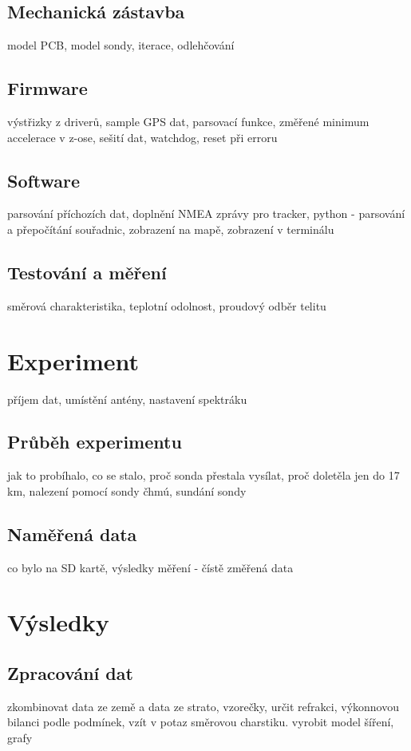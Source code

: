 \documentclass[twoside]{ctuthesis}
\theoremstyle{plain}
\theoremstyle{definition}
\theoremstyle{note}
\begin{document}
	\section{Mechanická zástavba}
	model PCB, model sondy, iterace, odlehčování

	\section{Firmware}
	výstřizky z driverů, sample GPS dat, parsovací funkce, změřené minimum accelerace v z-ose, sešití dat, watchdog, reset při erroru

	\section{Software}
	parsování příchozích dat, doplnění NMEA zprávy pro tracker, python - parsování a přepočítání souřadnic, zobrazení na mapě, zobrazení v terminálu

	\section{Testování a měření}
	směrová charakteristika, teplotní odolnost, proudový odběr telitu 




\chapter{Experiment}
příjem dat, umístění antény, nastavení spektráku
	\section{Průběh experimentu}
	jak to probíhalo, co se stalo, proč sonda přestala vysílat, proč doletěla jen do 17 km, nalezení pomocí sondy čhmú, sundání sondy

	\section{Naměřená data}
	co bylo na SD kartě, výsledky měření - čístě změřená data



\chapter{Výsledky}
	\section{Zpracování dat}
	zkombinovat data ze země a data ze strato, vzorečky, určit refrakci, výkonnovou bilanci podle podmínek, vzít v potaz směrovou charstiku. vyrobit model šíření, grafy
\end{document}
